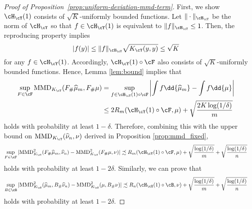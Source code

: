 \documentclass[11pt]{article}
\begin{document}
\begin{proof}[Proof of Proposition~\ref{prop:uniform-deviation-mmd-term}]
	First, we show $\cH_{\cY}(1)$ consists of $\sqrt{K}$-uniformly bounded functions. Let $\|\cdot\|_{\cH_{\cY}}$ be the norm of $\cH_{\cY}$ so that $f \in \cH_{\cY}(1)$ is equivalent to $\|f\|_{\cH_{\cY}} \le 1$. Then, the reproducing property implies
	\begin{equation*}
		|f(y)| \le \|f\|_{\cH_{\cY}} \sqrt{K_{\cY}(y, y)} \le \sqrt{K} 
	\end{equation*}
	for any $f \in \cH_{\cY}(1)$. Accordingly, $\cH_{\cY}(1) \circ \cF$ also consists of $\sqrt{K}$-uniformly bounded functions. Hence, Lemma \ref{lem:bound} implies that
	\begin{equation*}
		\begin{split}
			\sup_{F \in \cF} \mathrm{MMD}_{K_{\cY}}(F_{\#}\widehat{\mu}_{m}, F_{\#}\mu)
			&= \sup_{f \in \cH_{\cY}(1) \circ \cF} \left|\int f \dd{\widehat{\mu}_{m}} - \int f \dd{\mu} \right| \\
			&\le 2 R_m(\cH_{\cY}(1) \circ \cF, \mu) + \sqrt{\frac{2 K \log(1/\delta)}{m}}
		\end{split}
	\end{equation*}
	holds with probability at least $1 - \delta$. Therefore, combining this with the upper bound on $\mathrm{MMD}_{K_{\cY}}(\widehat{\nu}_n, \nu)$ derived in Proposition \ref{prop:mmd_fixed},
	\begin{equation}
		\label{eqn:m1}
		\sup_{F \in \cF} |\mathrm{MMD}^2_{K_{\cY}}(F_{\#}\widehat{\mu}_m, \widehat{\nu}_n) - \mathrm{MMD}^2_{K_{\cY}}(F_{\#}\mu, \nu)|
		\precsim 
		R_m(\cH_{\cY}(1) \circ \cF, \mu) + \sqrt{\frac{\log(1/\delta)}{m}} + \sqrt{\frac{\log(1/\delta)}{n}}
	\end{equation}
	holds with probability at least $1 - 2 \delta$. Similarly, we can prove that
	\begin{equation}
		\label{eqn:m2} 
		\sup_{B \in \cB} |\mathrm{MMD}^2_{K_{\cX}}(\widehat{\mu}_m, B_{\#}\widehat{\nu}_n) - \mathrm{MMD}^2_{K_{\cX}}(\mu, B_{\#} \nu)| 
		\precsim 
		R_n(\cH_{\cX}(1) \circ \cB, \nu) + \sqrt{\frac{\log(1/\delta)}{m}} + \sqrt{\frac{\log(1/\delta)}{n}}
	\end{equation}
	holds with probability at least $1 - 2 \delta$. 
	

\end{proof}
\end{document}
